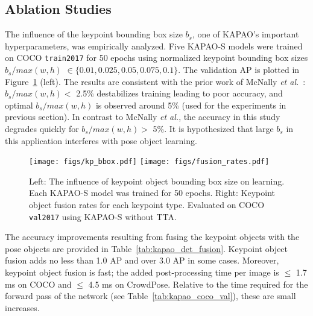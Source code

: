 \documentclass[runningheads]{llncs}
\newcommand{\etal}{\textit{et al.}}
\begin{document}
\subsection{Ablation Studies}
\label{sec:kapao_ablation}


The influence of the keypoint bounding box size $b_s$, one of KAPAO's important hyperparameters, was empirically analyzed. Five KAPAO-S models were trained on COCO \texttt{train2017} for 50 epochs using normalized keypoint bounding box sizes $b_s/max(w,h)$ $\in\{0.01, 0.025, 0.05, 0.075, 0.1\}$. The validation AP is plotted in Figure~\ref{fig:kapao_kp_bbox_fusion} (left). The results are consistent with the prior work of McNally \etal~\cite{mcnally2021deepdarts}: $b_s/max(w,h) <$ 2.5\% destabilizes training leading to poor accuracy, and optimal $b_s/max(w,h)$ is observed around 5\% (used for the experiments in previous section). In contrast to McNally \etal, the accuracy in this study degrades quickly for $b_s/max(w,h) >$ 5\%. It is hypothesized that large $b_s$ in this application interferes with pose object learning. 

\begin{figure}[t!]
\centering
    \texttt{[image: figs/kp\_bbox.pdf]}
    \texttt{[image: figs/fusion\_rates.pdf]}
\caption{Left: The influence of keypoint object bounding box size on learning. Each KAPAO-S model was trained for 50 epochs. Right: Keypoint object fusion rates for each keypoint type. Evaluated on COCO \texttt{val2017} using KAPAO-S without TTA.}
\label{fig:kapao_kp_bbox_fusion}
\end{figure}

The accuracy improvements resulting from fusing the keypoint objects with the pose objects are provided in Table~\ref{tab:kapao_det_fusion}. Keypoint object fusion adds no less than 1.0 AP and over 3.0 AP in some cases. Moreover, keypoint object fusion is fast; the added post-processing time per image is $\leq$ 1.7 ms on COCO and $\leq$ 4.5 ms on CrowdPose. Relative to the time required for the forward pass of the network (see Table~\ref{tab:kapao_coco_val}), these are small increases.
\end{document}
